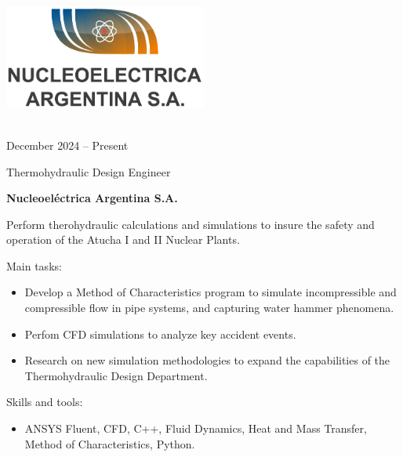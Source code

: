 \documentclass[a4paper,10pt]{article}
\newlength{\cvcolumngapwidth}
\newlength{\cvleftcolumnwidth}
\newlength{\cvrightcolumnwidth}
\newcommand{\cvtitlestyle}[1]{{\large\cvtitlefont\textcolor{cvtitlecolor}{#1}}}
\newcommand{\cvdurationstyle}[1]{{\small\cvdurationfont\textcolor{cvdurationcolor}{#1}}}
\newlength{\cvafteritemskipamount}
\newlength{\cvaftertitleskipamount}
\newlength{\cvparskip}
\newcommand{\cvitem}[2]{
    \begin{minipage}[t]{\cvleftcolumnwidth}
        \raggedleft #1
    \end{minipage}%
    \hspace{\cvcolumngapwidth}%
    \begin{minipage}[t]{\cvrightcolumnwidth}
        \setlength{\parskip}{\cvparskip} #2
    \end{minipage}

    \vspace{\cvafteritemskipamount}
}
\newcommand{\cvtitle}[1]{
    \cvtitlestyle{#1}

    \vspace{\cvaftertitleskipamount}
    \vspace{-\cvparskip}
}
\begin{document}
\cvitem{
	\begin{minipage}{\textwidth}
    \begin{flushright}
		  \includegraphics[width=0.5\textwidth]{../logos-photos/Logo_NASA.png}   
    \end{flushright}  
  \end{minipage} \\
  \vspace{0.3cm}
  \cvdurationstyle{December 2024 -- Present}\\
}{
	
  \cvtitle{Thermohydraulic Design Engineer}
  \textbf{\large Nucleoeléctrica Argentina S.A.}

  Perform therohydraulic calculations and simulations to insure the safety and operation of the Atucha I and II Nuclear
  Plants.

  Main tasks:
  \begin{itemize}
    \item Develop a Method of Characteristics program to simulate incompressible and compressible flow in pipe systems, and
        capturing water hammer phenomena.
    \item Perfom CFD simulations to analyze key accident events. 
    \item Research on new simulation methodologies to expand the capabilities of the Thermohydraulic Design Department.
  \end{itemize}

  Skills and tools:
  \begin{itemize}
      \item ANSYS Fluent, CFD, C++, Fluid Dynamics, Heat and Mass Transfer, Method of Characteristics, Python.
  \end{itemize}
  
}
\end{document}
